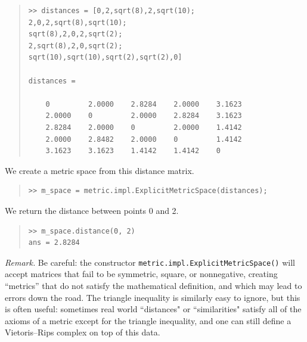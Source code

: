 \documentclass[amscd, amssymb, verbatim]{amsart}[12pt]
\theoremstyle{remark}
\theoremstyle{remark}
\theoremstyle{remark}
\begin{document}
\begin{quote} \begin{verbatim}
>> distances = [0,2,sqrt(8),2,sqrt(10);
2,0,2,sqrt(8),sqrt(10);
sqrt(8),2,0,2,sqrt(2);
2,sqrt(8),2,0,sqrt(2);
sqrt(10),sqrt(10),sqrt(2),sqrt(2),0]

distances =

    0         2.0000    2.8284    2.0000    3.1623
    2.0000    0         2.0000    2.8284    3.1623
    2.8284    2.0000    0         2.0000    1.4142
    2.0000    2.8482    2.0000    0         1.4142
    3.1623    3.1623    1.4142    1.4142    0
\end{verbatim} \end{quote}

We create a metric space from this distance matrix.

\begin{quote} \begin{verbatim}
>> m_space = metric.impl.ExplicitMetricSpace(distances);
\end{verbatim} \end{quote}

We return the distance between points 0 and 2.

\begin{quote} \begin{verbatim}
>> m_space.distance(0, 2)
ans = 2.8284 
\end{verbatim} \end{quote}

{\em Remark.} Be careful: the constructor \texttt{metric.impl.ExplicitMetricSpace()} will accept matrices that fail to be symmetric, square, or nonnegative, creating ``metrics'' that do not satisfy the mathematical definition, and which may lead to errors down the road. The triangle inequality is similarly easy to ignore, but this is often useful: sometimes real world ``distances" or ``similarities" satisfy all of the axioms of a metric except for the triangle inequality, and one can still define a Vietoris--Rips complex on top of this data.
\end{document}

